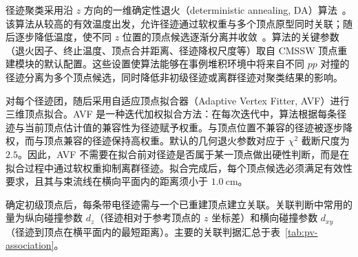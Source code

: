 径迹聚类采用沿 $z$ 方向的一维确定性退火（deterministic annealing, DA）算法~\cite{roseDeterministicAnnealingApproach1990,roseDeterministicAnnealingClustering1998}。该算法从较高的有效温度出发，允许径迹通过软权重与多个顶点原型同时关联；随后逐步降低温度，使不同 $z$ 位置的顶点候选逐渐分离并收敛~\cite{Chabanat:2005zz}。算法的关键参数（退火因子、终止温度、顶点合并距离、径迹降权尺度等）取自 CMSSW 顶点重建模块的默认配置。这些设置使算法能够在事例堆积环境中将来自不同 $pp$ 对撞的径迹分离为多个顶点候选，同时降低非初级径迹或离群径迹对聚类结果的影响。

对每个径迹团，随后采用自适应顶点拟合器（Adaptive Vertex Fitter, AVF）进行三维顶点拟合。AVF 是一种迭代加权拟合方法：在每次迭代中，算法根据每条径迹与当前顶点估计值的兼容性为径迹赋予权重。与顶点位置不兼容的径迹被逐步降权，而与顶点兼容的径迹保持高权重。默认的几何退火参数对应于 $\chi^2$ 截断尺度为 $2.5$。因此，AVF 不需要在拟合前对径迹是否属于某一顶点做出硬性判断，而是在拟合过程中通过软权重抑制离群径迹。拟合完成后，每个顶点候选必须满足有效性要求，且其与束流线在横向平面内的距离须小于 $\SI{1.0}{\centi\meter}$。

确定初级顶点后，每条带电径迹需与一个已重建顶点建立关联。关联判断中常用的量为纵向碰撞参数 $d_z$（径迹相对于参考顶点的 $z$ 坐标差）和横向碰撞参数 $d_{xy}$（径迹到顶点在横平面内的最短距离）。主要的关联判据汇总于表~\ref{tab:pv-association}。

